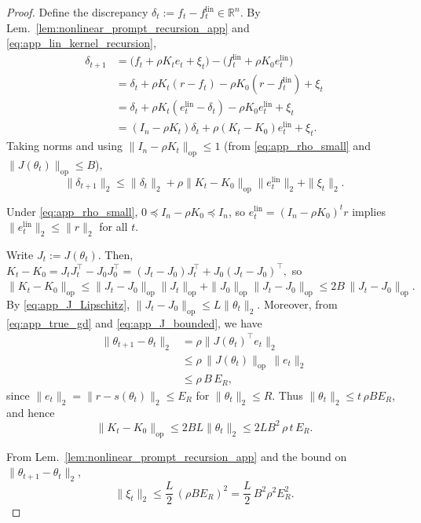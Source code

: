 \documentclass{article}
\theoremstyle{plain}
\theoremstyle{definition}
\theoremstyle{remark}
\begin{document}
\begin{proof}
Define the discrepancy $\delta_t:=f_t-f_t^{\mathrm{lin}}\in\mathbb{R}^n$. By
Lem.~\ref{lem:nonlinear_prompt_recursion_app} and \eqref{eq:app_lin_kernel_recursion},
\begin{align*}
\delta_{t+1}
&=
\bigl(f_t+\rho K_t e_t+\xi_t\bigr)-\bigl(f_t^{\mathrm{lin}}+\rho K_0 e_t^{\mathrm{lin}}\bigr) \\
&=
\delta_t+\rho K_t(r-f_t)-\rho K_0(r-f_t^{\mathrm{lin}})+\xi_t \\
&=
\delta_t+\rho K_t(e_t^{\mathrm{lin}}-\delta_t)-\rho K_0 e_t^{\mathrm{lin}}+\xi_t \\
&=
(I_n-\rho K_t)\delta_t + \rho (K_t-K_0)e_t^{\mathrm{lin}}+\xi_t.
\end{align*}
Taking norms and using $\|I_n-\rho K_t\|_{\mathrm{op}}\le 1$ (from \eqref{eq:app_rho_small} and $\|J(\theta_t)\|_{\mathrm{op}}\le B$),
\begin{equation}
\|\delta_{t+1}\|_2
\le
\|\delta_t\|_2 + \rho\|K_t-K_0\|_{\mathrm{op}}\|e_t^{\mathrm{lin}}\|_2+\|\xi_t\|_2.
\label{eq:app_delta_step}
\end{equation}

Under \eqref{eq:app_rho_small}, $0\preceq I_n-\rho K_0\preceq I_n$, so
$e_t^{\mathrm{lin}}=(I_n-\rho K_0)^t r$ implies $\|e_t^{\mathrm{lin}}\|_2\le \|r\|_2$ for all $t$.

Write $J_t:=J(\theta_t)$. Then, $K_t-K_0=J_tJ_t^\top-J_0J_0^\top=(J_t-J_0)J_t^\top + J_0(J_t-J_0)^\top,$
so
\(
\|K_t-K_0\|_{\mathrm{op}}
\le \|J_t-J_0\|_{\mathrm{op}}\|J_t\|_{\mathrm{op}}+\|J_0\|_{\mathrm{op}}\|J_t-J_0\|_{\mathrm{op}}
\le 2B\,\|J_t-J_0\|_{\mathrm{op}}.
\)
By \eqref{eq:app_J_Lipschitz}, $\|J_t-J_0\|_{\mathrm{op}}\le L\|\theta_t\|_2$. Moreover, from \eqref{eq:app_true_gd} and
\eqref{eq:app_J_bounded}, we have
\begin{align*}
   \|\theta_{t+1}-\theta_t\|_2 
   &=\rho\|J(\theta_t)^\top e_t\|_2  \\ 
   &\le \rho\,\|J(\theta_t)\|_{\mathrm{op}}\,\|e_t\|_2 \\
   &\le \rho\,B\,E_R,
\end{align*}
since $\|e_t\|_2=\|r-s(\theta_t)\|_2\le E_R$ for $\|\theta_t\|_2\le R$.
Thus $\|\theta_t\|_2\le t\,\rho B E_R$, and hence
\begin{equation}
    \|K_t-K_0\|_{\mathrm{op}} \le 2B  L\|\theta_t\|_2 \le 2LB^2\,\rho\,t\,E_R.
\label{eq:app_K_drift}
\end{equation}


From Lem.~\ref{lem:nonlinear_prompt_recursion_app} and the bound on $\|\theta_{t+1}-\theta_t\|_2$,
\begin{equation}
     \|\xi_t\|_2
     \le \frac{L}{2}\,(\rho B E_R)^2
     =\frac{L}{2}\,B^2\rho^2 E_R^2.
\label{eq:app_xi_final}
\end{equation}


\end{proof}
\end{document}
